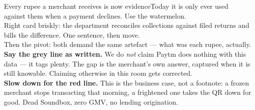 \documentclass[aspectratio=169,10pt]{beamer}
\begin{document}
\begin{frame}{Every rupee a merchant receives is now evidence}{Today it is only ever used against them}
{when a payment declines. Use the watermelon.
\\[0.4em]
Right card briskly: the department reconciles collections against filed returns
and bills the difference. One sentence, then move.
\\[0.4em]
Then the pivot: both demand the same artefact --- what was each rupee, actually.
\\[0.4em]
\textbf{Say the grey line as written.} We do \emph{not} claim Paytm does nothing
with this data --- it tags plenty. The gap is the merchant's own answer, captured
when it is still knowable. Claiming otherwise in this room gets corrected.
\\[0.4em]
\textbf{Slow down for the red line.} This is the business case, not a footnote:
a frozen merchant stops transacting that morning, a frightened one takes the QR
down for good. Dead Soundbox, zero GMV, no lending origination.}
\end{frame}
\end{document}
